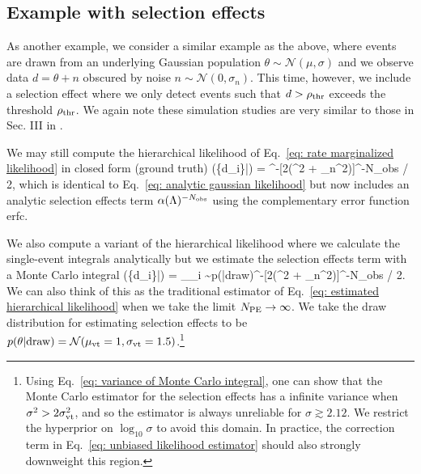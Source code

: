 \subsection{Example with selection effects}
\label{subsec: mc example with selection effects}

As another example, we consider a similar example as the above, where events are drawn from an underlying Gaussian population $\theta \sim\mathcal{N}(\mu, \sigma)$ and we observe data $d=\theta+n$ obscured by noise $n\sim\mathcal{N}(0,\sigma_n)$. This time, however, we include a selection effect where we only detect events such that $d > \rho_{\rm thr}$ exceeds the threshold $\rho_{\rm thr}$. We again note these simulation studies are very similar to those in Sec. III in \citet{Essick:2022ojx}.

We may still compute the hierarchical likelihood of Eq.~\ref{eq: rate marginalized likelihood} in closed form (ground truth)
\beq
{}(\{d_i\}|\Lambda) = ^{-\Nobs}[2\pi(\sigma^2 + \sigma_n^2)]^{-N_{\rm obs} / 2}\exp\left[-\sum_{j=1}^{N_{\rm obs}}\frac{(d_j - \mu)^2}{2(\sigma^2 + \sigma_n^2)}\right],
\label{eq: analytic gaussian likelihood with vt}
\eeq
which is identical to Eq.~\ref{eq: analytic gaussian likelihood} but now includes an analytic selection effects term $\alpha(\Lambda)^{-N_{\rm obs}}$ using the complementary error function erfc.

We also compute a variant of the hierarchical likelihood where we calculate the single-event integrals analytically but we estimate the selection effects term with a Monte Carlo integral
\beq
{}(\{d_i\}|\Lambda) = \left[\frac{1}{\Ninj}\sum_{j=1}^{\Nfound}\frac{p(\theta_{i}|\Lambda)}{p(\theta_{i}|{\rm draw})}\right]_{\theta_{i} \sim p(\theta|{\rm draw})}^{-\Nobs}[2\pi(\sigma^2 + \sigma_n^2)]^{-N_{\rm obs} / 2}\exp\left[-\sum_{j=1}^{N_{\rm obs}}\frac{(d_j - \mu)^2}{2(\sigma^2 + \sigma_n^2)}\right].
\label{eq: estimated gaussian likelihood with vt}
\eeq
We can also think of this as the traditional estimator of Eq.~\ref{eq: estimated hierarchical likelihood} when we take the limit $N_{\rm PE} \to \infty$. We take the draw distribution for estimating selection effects to be $p(\theta|{\rm draw}) = \mathcal{N}(\mu_{\rm vt}=1,\sigma_{\rm vt}=1.5)$.\footnote{Using Eq.~\ref{eq: variance of Monte Carlo integral}, one can show that the Monte Carlo estimator for the selection effects has a infinite variance when $\sigma^2 > 2\sigma_{\rm vt}^2$, and so the estimator is always unreliable for $\sigma \gtrsim 2.12$. We restrict the hyperprior on $\log_{10}\sigma$ to avoid this domain. In practice, the correction term in Eq.~\ref{eq: unbiased likelihood estimator} should also strongly downweight this region.}

